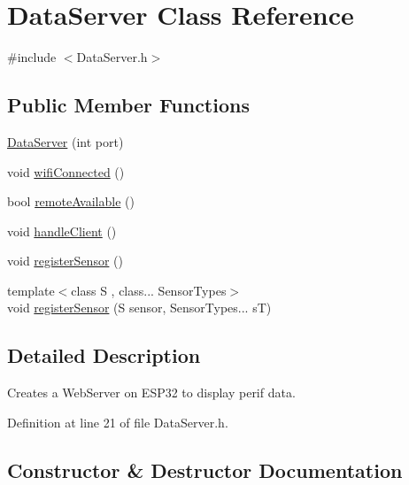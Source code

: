 \hypertarget{classDataServer}{}\section{Data\+Server Class Reference}
\label{classDataServer}


{\ttfamily \#include $<$Data\+Server.\+h$>$}

\subsection*{Public Member Functions}
\begin{DoxyCompactItemize}
\item 
\mbox{\hyperlink{classDataServer_a66cf82f11a9dfeb2e4d7c2cd9f1febdc}{Data\+Server}} (int port)
\item 
void \mbox{\hyperlink{classDataServer_a7652c5c4c0db565342ea40e031b55f87}{wifi\+Connected}} ()
\item 
bool \mbox{\hyperlink{classDataServer_a8574790df14c97bc7b42eb52214ca76f}{remote\+Available}} ()
\item 
void \mbox{\hyperlink{classDataServer_a1bae1311f782108d515fe1127029dd2f}{handle\+Client}} ()
\item 
void \mbox{\hyperlink{classDataServer_a52ae55f6a58aa563e49501ae6ba8fab8}{register\+Sensor}} ()
\item 
{\footnotesize template$<$class S , class... Sensor\+Types$>$ }\\void \mbox{\hyperlink{classDataServer_a8b63f295c845c91db3aad45a9ab9b86a}{register\+Sensor}} (S sensor, Sensor\+Types... sT)
\end{DoxyCompactItemize}


\subsection{Detailed Description}
Creates a Web\+Server on E\+S\+P32 to display perif data. 

Definition at line 21 of file Data\+Server.\+h.



\subsection{Constructor \& Destructor Documentation}
\mbox{\label{classDataServer_a66cf82f11a9dfeb2e4d7c2cd9f1febdc}} 
